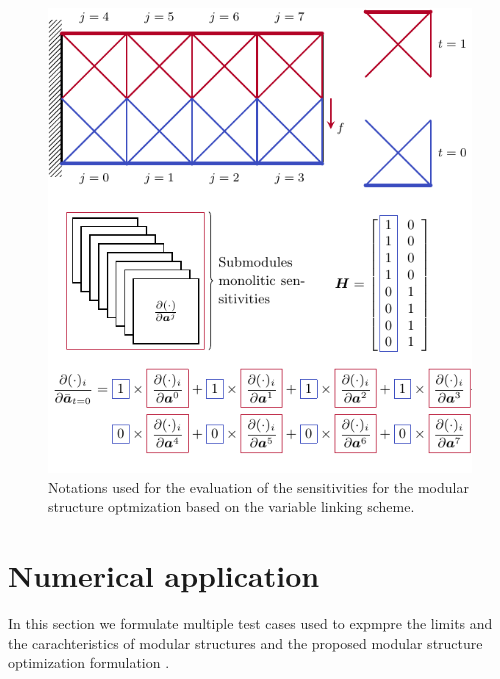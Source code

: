 \begin{figure}
    \centering
    \includegraphics{figures/05_cellular_opt/00_modules_VL_grad/modules_grad.pdf}
    \caption{Notations used for the evaluation of the sensitivities for the modular structure optmization based on the variable linking scheme.}
    \label{fig:05_VL_grad}
\end{figure}

\section{Numerical application} \label{sec:05_02}
In this section we formulate multiple test cases used to expmpre the limits and the carachteristics of modular structures and the proposed modular structure optimization formulation .

